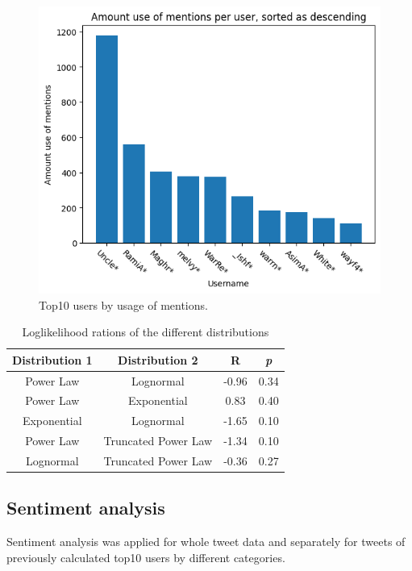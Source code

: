 \documentclass[conference]{IEEEtran}
\begin{document}
    \begin{figure}
        \includegraphics[scale=0.6]{figures/amount_mentions_user}
        \caption{Top10 users by usage of mentions.}
        \label{fig:amount-mentions-user}
    \end{figure}
    \begin{table}
        \begin{tabular}{ |c|c|c|c|}
            \hline
            Distribution 1 & Distribution 2      & R     & \textit{p} \\
            \hline
            Power Law      & Lognormal           & -0.96 & 0.34       \\
            \hline
            Power Law      & Exponential         & 0.83  & 0.40       \\
            \hline
            Exponential    & Lognormal           & -1.65 & 0.10       \\
            \hline
            Power Law      & Truncated Power Law & -1.34 & 0.10       \\
            \hline
            Lognormal      & Truncated Power Law & -0.36 & 0.27       \\
            \hline
        \end{tabular}
        \caption{Loglikelihood rations of the different distributions}
        \label{tab:powerlaw}
    \end{table}

    \subsection{Sentiment analysis}
    Sentiment analysis was applied for whole tweet data and separately for tweets of previously calculated top10 users by different categories.
\end{document}
